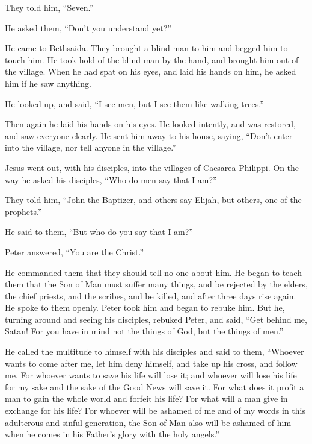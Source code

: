 They told him, ``Seven.''

 He asked them, ``Don't you understand yet?''

 He came to Bethsaida. They brought a blind man to him
and begged him to touch him.  He took hold of the blind
man by the hand, and brought him out of the village. When he had spat on
his eyes, and laid his hands on him, he asked him if he saw anything.

 He looked up, and said, ``I see men, but I see them like
walking trees.''

 Then again he laid his hands on his eyes. He looked
intently, and was restored, and saw everyone clearly.  He
sent him away to his house, saying, ``Don't enter into the village, nor
tell anyone in the village.''

 Jesus went out, with his disciples, into the villages of
Caesarea Philippi. On the way he asked his disciples, ``Who do men say
that I am?''

 They told him, ``John the Baptizer, and others say
Elijah, but others, one of the prophets.''

 He said to them, ``But who do you say that I am?''

Peter answered, ``You are the Christ.''

 He commanded them that they should tell no one about
him.  He began to teach them that the Son of Man must
suffer many things, and be rejected by the elders, the chief priests,
and the scribes, and be killed, and after three days rise again.
 He spoke to them openly. Peter took him and began to
rebuke him.  But he, turning around and seeing his
disciples, rebuked Peter, and said, ``Get behind me, Satan! For you have
in mind not the things of God, but the things of men.''

 He called the multitude to himself with his disciples
and said to them, ``Whoever wants to come after me, let him deny
himself, and take up his cross, and follow me.  For
whoever wants to save his life will lose it; and whoever will lose his
life for my sake and the sake of the Good News will save it.
 For what does it profit a man to gain the whole world
and forfeit his life?  For what will a man give in
exchange for his life?  For whoever will be ashamed of me
and of my words in this adulterous and sinful generation, the Son of Man
also will be ashamed of him when he comes in his Father's glory with the
holy angels.''

